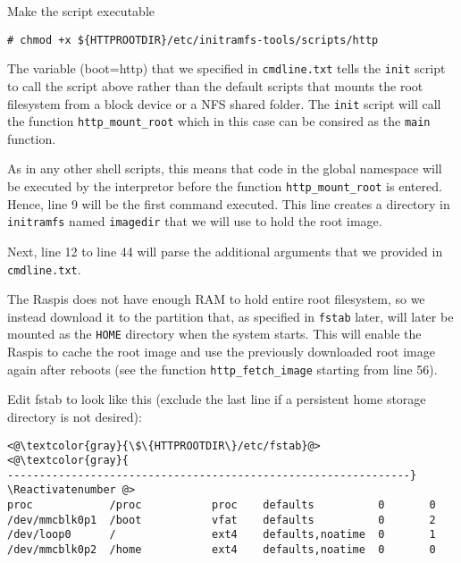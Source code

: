Make the script executable
\begin{lstlisting}[]
# chmod +x ${HTTPROOTDIR}/etc/initramfs-tools/scripts/http
\end{lstlisting}
\FloatBarrier
\vspace{-5mm}

The variable (boot=http) that we specified in \texttt{cmdline.txt} tells the
\texttt{init} script to call the script above rather than the default scripts
that mounts the root filesystem from a block device or a \ac{NFS} shared
folder. The \texttt{init} script will call the function \texttt{http\_mount\_root}
which in this case can be consired as the \texttt{main} function.

As in any other shell scripts, this means that code in the global namespace
will be executed by the interpretor before the function \texttt{http\_mount\_root}
is entered.
Hence, line 9 will be the first command executed. This line creates a directory
in \texttt{initramfs} named
\texttt{imagedir} that we will use to hold the root image.

Next, line 12 to line 44 will parse the additional arguments that we provided in
\texttt{cmdline.txt}.


The \ac{Raspi}s does not have enough \ac{RAM} to hold entire root
filesystem, so we instead download it to the partition that, as specified in
\texttt{fstab} later, will later be mounted as the \texttt{HOME} directory
when the system starts. This will enable the \ac{Raspi}s to cache the root image
and use the previously downloaded root image again after reboots (see the
function \texttt{http\_fetch\_image} starting from line 56).




Edit fstab to look like this (exclude the last line if a persistent
home storage directory is not desired):
\Suppressnumber\begin{lstlisting}[]
<@\textcolor{gray}{\$\{HTTPROOTDIR\}/etc/fstab}@>
<@\textcolor{gray}{
---------------------------------------------------------------}
\Reactivatenumber @>
proc            /proc           proc    defaults          0       0
/dev/mmcblk0p1  /boot           vfat    defaults          0       2
/dev/loop0      /               ext4    defaults,noatime  0       1
/dev/mmcblk0p2  /home           ext4    defaults,noatime  0       0
\end{lstlisting}
\FloatBarrier
\vspace{-5mm}


